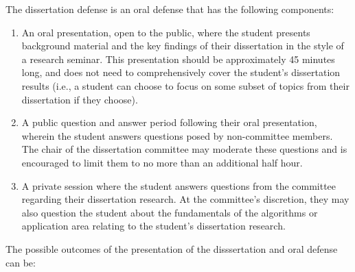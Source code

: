 The dissertation defense is an oral defense that has the following
components:

\begin{enumerate}

\item An oral presentation, open to the public, where the student
  presents background material and the key findings of their
  dissertation in the style of a research seminar.  This presentation
  should be approximately 45 minutes long, and does not need to
  comprehensively cover the student's dissertation results (i.e., a
  student can choose to focus on some subset of topics from their
  dissertation if they choose).

\item A public question and answer period following their oral
  presentation, wherein the student answers questions posed by
  non-committee members.  The chair of the dissertation committee may
  moderate these questions and is encouraged to limit them to no more
  than an additional half hour.

\item A private session where the student answers questions from the
  committee regarding their dissertation research.  At the committee's
  discretion, they may also question the student about the
  fundamentals of the algorithms or application area relating to the
  student's dissertation research.

\end{enumerate}

The possible outcomes of the presentation of the disssertation and oral defense can be:

